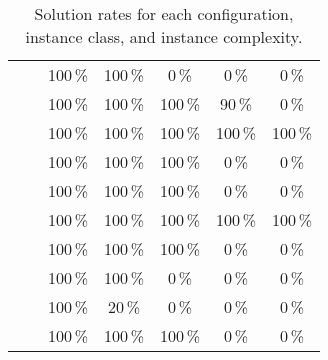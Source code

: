 \begin{table}
\begin{tabular}{|l|l|ccccc|}
			& \parabolawalk   & 100\,\% & 100\,\% &   0\,\% &   0\,\% &   0\,\% \\
			& \concavevalleys & 100\,\% & 100\,\% & 100\,\% &  90\,\% &   0\,\% \\
		\hline
		\multirow{4}{*}{\pnodom}
			& \walk           & 100\,\% & 100\,\% & 100\,\% & 100\,\% & 100\,\% \\
			& \sinewalk       & 100\,\% & 100\,\% & 100\,\% &   0\,\% &   0\,\% \\
			& \parabolawalk   & 100\,\% & 100\,\% & 100\,\% &   0\,\% &   0\,\% \\
			& \concavevalleys & 100\,\% & 100\,\% & 100\,\% & 100\,\% & 100\,\% \\
		\hline
		\multirow{4}{*}{\pnow}
			& \walk           & 100\,\% & 100\,\% & 100\,\% &   0\,\% &   0\,\% \\
			& \sinewalk       & 100\,\% & 100\,\% &   0\,\% &   0\,\% &   0\,\% \\
			& \parabolawalk   & 100\,\% &  20\,\% &   0\,\% &   0\,\% &   0\,\% \\
			& \concavevalleys & 100\,\% & 100\,\% & 100\,\% &   0\,\% &   0\,\% \\
		\hline
	\end{tabular}
	\caption{Solution rates for each configuration, instance class, and instance complexity.}
	\label{tab:percentage}
\end{table}

